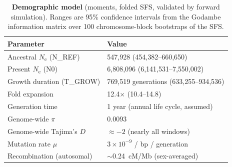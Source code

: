 \documentclass[11pt]{article}
\newcommand{\Ne}{N_\mathrm{e}}
\begin{document}
\begin{table}[t]\centering
  \caption{\textbf{Demographic model} (moments, folded SFS, validated by forward simulation). Ranges are 95\% confidence intervals from the Godambe information matrix over 100 chromosome-block bootstraps of the SFS.}
  \label{tab:demog}
  \begin{tabular}{ll}
    \toprule
    Parameter & Value \\
    \midrule
    Ancestral $\Ne$ (N\_REF)     & 547{,}928 (454{,}382--660{,}650) \\
    Present $\Ne$ (N0)           & 6{,}808{,}096 (6{,}141{,}531--7{,}550{,}002) \\
    Growth duration (T\_GROW)    & 769{,}519 generations (633{,}255--934{,}536) \\
    Fold expansion               & 12.4$\times$ (10.4--14.8) \\
    Generation time              & 1 year (annual life cycle, assumed) \\
    Genome-wide $\pi$            & 0.0093 \\
    Genome-wide Tajima's $D$     & $\approx-2$ (nearly all windows) \\
    Mutation rate $\mu$          & $3\times10^{-9}$ / bp / generation \\
    Recombination (autosomal)    & $\sim$0.24~cM/Mb (sex-averaged) \\
    \bottomrule
  \end{tabular}
\end{table}
\end{document}
